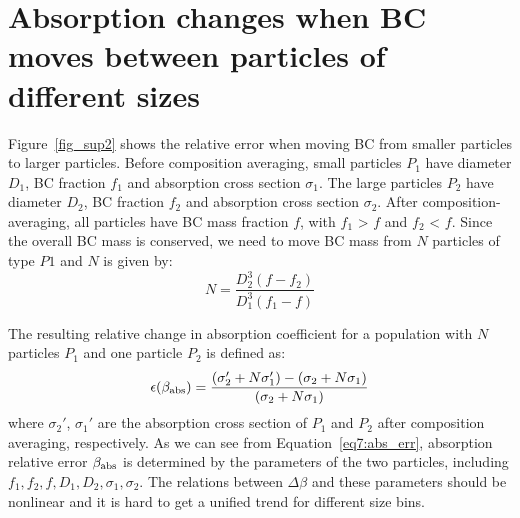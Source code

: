 \documentclass[edeposit,fullpage]{uiucthesis2009}
\begin{document}
\section{Absorption changes when BC moves between particles of different sizes}

Figure~\ref{fig_sup2} shows the relative error when moving BC
from smaller particles to larger particles. Before composition
averaging, small particles $P_1$ have diameter $D_1$, BC fraction
$f_1$ and absorption cross section $\sigma_1$. The large particles
$P_2$ have diameter $D_2$, BC fraction $f_2$ and absorption cross
section $\sigma_2$. After composition-averaging, all particles have BC
mass fraction $f$, with $f_1$ > $f$ and $f_2$ < $f$. Since the overall
BC mass is conserved, we need to move BC mass from $N$ particles of
type $P1$ and $N$ is given by:
\begin{equation}
N = \frac{D_2^3(f-f_2)}{D_1^3(f_1-f)}
\end{equation}

The resulting relative change in absorption coefficient for a
population with $N$ particles $P_1$ and one particle $P_2$ is defined
as:
  \begin{equation}{\label{eq7:abs_err}}
   \epsilon(\beta_{\rm abs}) = \frac{(\sigma_2' + N\sigma_1') - (\sigma_2 + N\sigma_1)}{(\sigma_2 + N\sigma_1)}
  \end{equation}
  where $\sigma_2'$, $\sigma_1'$ are the absorption cross section of
  $P_1$ and $P_2$ after composition averaging, respectively.  As we
  can see from Equation~\ref{eq7:abs_err}, absorption relative error
  $\beta_{\rm abs}$ is determined by the parameters of the two
  particles, including $f_1, f_2, f, D_1, D_2,\sigma_1, \sigma_2$. The
  relations between $\Delta \beta$ and these parameters should be
  nonlinear and it is hard to get a unified trend for different size
  bins.
  
\end{document}
